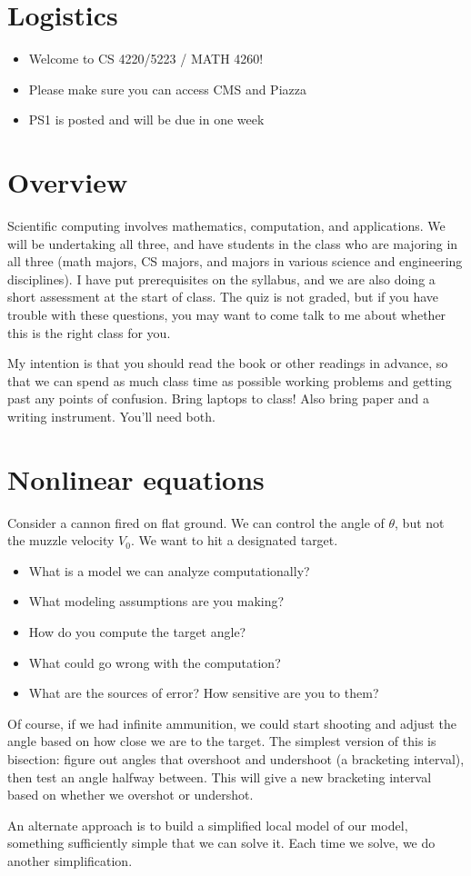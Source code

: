 \documentclass[12pt, leqno]{article}
\begin{document}

\section{Logistics}

\begin{itemize}
\item Welcome to CS 4220/5223 / MATH 4260!
\item Please make sure you can access CMS and Piazza
\item PS1 is posted and will be due in one week
\end{itemize}

\section{Overview}

Scientific computing involves mathematics, computation, and
applications.  We will be undertaking all three, and have students in
the class who are majoring in all three (math majors, CS majors, and
majors in various science and engineering disciplines).  I have put
prerequisites on the syllabus, and we are also doing a short
assessment at the start of class.  The quiz is not graded, but if you
have trouble with these questions, you may want to come talk to me
about whether this is the right class for you.

My intention is that you should read the book or other readings in
advance, so that we can spend as much class time as possible working
problems and getting past any points of confusion.  Bring laptops to class!
Also bring paper and a writing instrument.  You'll need both.

\section{Nonlinear equations}

Consider a cannon fired on flat ground.  We can control the angle of
$\theta$, but not the muzzle velocity $V_0$.  We want to hit a
designated target.
\begin{itemize}
\item
  What is a model we can analyze computationally?
\item
  What modeling assumptions are you making?
\item
  How do you compute the target angle?
\item
  What could go wrong with the computation?
\item
  What are the sources of error?  How sensitive are you to them?
\end{itemize}

Of course, if we had infinite ammunition, we could start shooting and
adjust the angle based on how close we are to the target.  The
simplest version of this is bisection: figure out angles that
overshoot and undershoot (a bracketing interval), then test an angle
halfway between.  This will give a new bracketing interval based on
whether we overshot or undershot.

An alternate approach is to build a simplified local model of our
model, something sufficiently simple that we can solve it.  Each time
we solve, we do another simplification.
\end{document}
